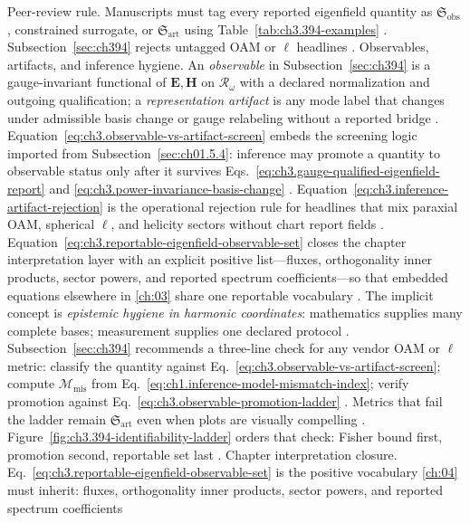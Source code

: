 Peer-review rule. Manuscripts must tag every reported eigenfield quantity as \(\mathfrak{S}_{\mathrm{obs}}\), constrained surrogate, or
\(\mathfrak{S}_{\mathrm{art}}\) using Table~\ref{tab:ch3.394-examples} \cite{harrington2001}. Subsection~\ref{sec:ch394}
rejects untagged OAM or \(\ell\) headlines \cite{allen1992}.
Observables, artifacts, and inference hygiene. An \emph{observable} in Subsection~\ref{sec:ch394} is a gauge-invariant functional of \(\mathbf{E},\mathbf{H}\) on
\(\mathcal{R}_\omega\) with a declared normalization and outgoing qualification; a \emph{representation artifact} is any
mode label that changes under admissible basis change or gauge relabeling without a reported bridge
\cite{belinfante1940}. Equation~\eqref{eq:ch3.observable-vs-artifact-screen} embeds the
screening logic imported from Subsection~\ref{sec:ch01.5.4}: inference may promote a quantity to observable status only
after it survives Eqs.~\eqref{eq:ch3.gauge-qualified-eigenfield-report} and \eqref{eq:ch3.power-invariance-basis-change}
\cite{harrington2001}. Equation~\eqref{eq:ch3.inference-artifact-rejection} is the
operational rejection rule for headlines that mix paraxial OAM, spherical \(\ell\), and helicity sectors without chart
report fields \cite{allen1992}. Equation~\eqref{eq:ch3.reportable-eigenfield-observable-set}
closes the chapter interpretation layer with an explicit positive list---fluxes, orthogonality inner products,
sector powers, and reported spectrum coefficients---so that embedded equations elsewhere in \ref{ch:03} share
one reportable vocabulary \cite{hansen1988}. The implicit concept is
\emph{epistemic hygiene in harmonic coordinates}: mathematics supplies many complete bases; measurement supplies one
declared protocol \cite{devaney2004}.
Subsection~\ref{sec:ch394} recommends a three-line check for any vendor OAM or \(\ell\) metric: classify the quantity against Eq.~\eqref{eq:ch3.observable-vs-artifact-screen}; compute \(\mathcal{M}_{\mathrm{mis}}\) from Eq.~\eqref{eq:ch1.inference-model-mismatch-index}; verify promotion against Eq.~\eqref{eq:ch3.observable-promotion-ladder}
\cite{harrington2001}. Metrics that fail the ladder remain \(\mathfrak{S}_{\mathrm{art}}\) even when plots are visually compelling
\cite{allen1992}. Figure~\ref{fig:ch3.394-identifiability-ladder} orders that check: Fisher bound first, promotion second, reportable set last
\cite{harrington2001}.
Chapter interpretation closure. Eq.~\eqref{eq:ch3.reportable-eigenfield-observable-set} is the positive vocabulary \ref{ch:04} must inherit: fluxes, orthogonality inner products, sector powers, and reported spectrum coefficients
